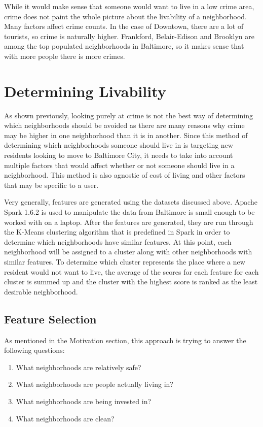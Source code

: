\documentclass[conference]{IEEEtran}
\begin{document}
While it would make sense that someone would want to live in a low crime area, crime does not paint the whole picture about
the livability of a neighborhood.  Many factors affect crime counts.
In the case of Downtown, there are a lot of tourists, so crime is naturally higher.  Frankford, Belair-Edison and Brooklyn are
among the top populated neighborhoods in Baltimore, so it makes sense that with more people there is more crimes.


\section{Determining Livability}
As shown previously, looking purely at crime is not the best way of determining which neighborhoods should be avoided as there are many
reasons why crime may be higher in one neighborhood than it is in another.  Since this method of determining which neighborhoods someone should live in is targeting new
residents looking to move to Baltimore City, it needs to take into account multiple factors that would affect whether or
not someone should live in a neighborhood.  This method is also agnostic of cost of living and other factors that may be
specific to a user.

Very generally, features are generated using the datasets discussed above.  Apache Spark 1.6.2 is used to
manipulate the data from Baltimore is small enough to be worked with on a laptop.
After the features are generated, they are run through the K-Means clustering algorithm that is predefined in Spark
in order to determine which neighborhoods have similar features.  At this point, each neighborhood will be assigned to
a cluster along with other neighborhoods with similar features.  To determine which cluster represents the place where a new resident would not want
to live, the average of the scores for each feature for each cluster is summed up and the cluster with the highest score
is ranked as the least desirable neighborhood.

\subsection{Feature Selection}
As mentioned in the Motivation section, this approach is trying to answer the following questions:
\begin{enumerate}
	\item What neighborhoods are relatively safe?
	\item What neighborhoods are people actually living in?
	\item What neighborhoods are being invested in?
	\item What neighborhoods are clean?
\end{enumerate}
\end{document}
